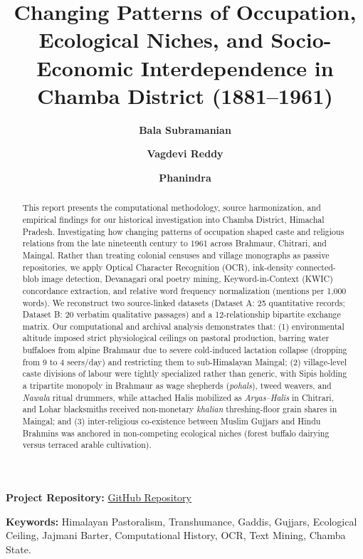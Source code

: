 \documentclass[11pt,a4paper]{article}
\title{\textbf{\Large Changing Patterns of Occupation, Ecological Niches, and Socio-Economic Interdependence in Chamba District (1881--1961)}\\[0.3em]
}
\author{
    \textbf{Bala Subramanian} \and 
    \textbf{Vagdevi Reddy} \and 
    \textbf{Phanindra} \\[0.5em]
}
\begin{document}
\date{} %

\maketitle

\noindent\textbf{Project Repository:}
\href{https://github.com/phanindragollapalli/History_project}{GitHub Repository}

\begin{abstract}
This report presents the computational methodology, source harmonization, and empirical findings for our historical investigation into Chamba District, Himachal Pradesh. Investigating how changing patterns of occupation shaped caste and religious relations from the late nineteenth century to 1961 across Brahmaur, Chitrari, and Maingal. Rather than treating colonial censuses and village monographs as passive repositories, we apply Optical Character Recognition (OCR), ink-density connected-blob image detection, Devanagari oral poetry mining, Keyword-in-Context (KWIC) concordance extraction, and relative word frequency normalization (mentions per 1,000 words). We reconstruct two source-linked datasets (Dataset A: 25 quantitative records; Dataset B: 20 verbatim qualitative passages) and a 12-relationship bipartite exchange matrix. Our computational and archival analysis demonstrates that: (1) environmental altitude imposed strict physiological ceilings on pastoral production, barring water buffaloes from alpine Brahmaur due to severe cold-induced lactation collapse (dropping from 9 to 4 seers/day) and restricting them to sub-Himalayan Maingal; (2) village-level caste divisions of labour were tightly specialized rather than generic, with Sipis holding a tripartite monopoly in Brahmaur as wage shepherds (\textit{pohals}), tweed weavers, and \textit{Nawala} ritual drummers, while attached Halis mobilized as \textit{Aryas--Halis} in Chitrari, and Lohar blacksmiths received non-monetary \textit{khalian} threshing-floor grain shares in Maingal; and (3) inter-religious co-existence between Muslim Gujjars and Hindu Brahmins was anchored in non-competing ecological niches (forest buffalo dairying versus terraced arable cultivation).
\end{abstract}

\vspace{0.5em}
\noindent\textbf{Keywords:} Himalayan Pastoralism, Transhumance, Gaddis, Gujjars, Ecological Ceiling, Jajmani Barter, Computational History, OCR, Text Mining, Chamba State.
\end{document}

